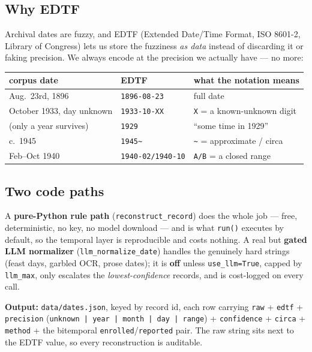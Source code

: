 \documentclass[11pt]{article}
\newcommand{\code}[1]{\texttt{\small #1}}
\begin{document}
\subsection{Why EDTF}

Archival dates are fuzzy, and EDTF (Extended Date/Time Format, ISO 8601-2, Library of Congress) lets us
store the fuzziness \emph{as data} instead of discarding it or faking precision. We always encode at
the precision we actually have --- no more:

\begin{numbersbox}
\centering\small
\begin{tabular}{ll p{6.2cm}}
\toprule
corpus date & EDTF & what the notation means \\
\midrule
Aug.\ 23rd, 1896          & \code{1896-08-23}      & full date \\
October 1933, day unknown & \code{1933-10-XX}      & \code{X} = a known-unknown digit \\
(only a year survives)    & \code{1929}            & ``some time in 1929'' \\
c.\ 1945                  & \code{1945\textasciitilde} & \code{\textasciitilde} = approximate / circa \\
Feb--Oct 1940             & \code{1940-02/1940-10} & \code{A/B} = a closed range \\
\bottomrule
\end{tabular}
\end{numbersbox}

\subsection{Two code paths}

A \textbf{pure-Python rule path} (\code{reconstruct\_record}) does the whole job --- free,
deterministic, no key, no model download --- and is what \code{run()} executes by default, so the
temporal layer is reproducible and costs nothing. A real but \textbf{gated} \textbf{LLM normalizer}
(\code{llm\_normalize\_date}) handles the genuinely hard strings (feast days, garbled OCR, prose
dates); it is \textbf{off} unless \code{use\_llm=True}, capped by \code{llm\_max}, only escalates the
\emph{lowest-confidence} records, and is cost-logged on every call.

\medskip
\noindent\textbf{Output:} \code{data/dates.json}, keyed by record id, each row carrying \code{raw} +
\code{edtf} + \code{precision} (\code{unknown\,|\,year\,|\,month\,|\,day\,|\,range}) +
\code{confidence} + \code{circa} + \code{method} + the bitemporal \code{enrolled}/\code{reported}
pair. The raw string sits next to the EDTF value, so every reconstruction is auditable.
\end{document}
